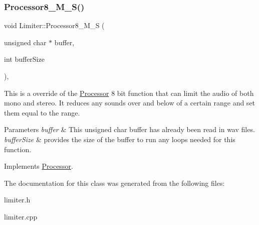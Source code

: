 \subsubsection{\texorpdfstring{Processor8\+\_\+\+M\+\_\+\+S()}{Processor8\_M\_S()}}
{\footnotesize\ttfamily void Limiter\+::\+Processor8\+\_\+\+M\+\_\+S (\begin{DoxyParamCaption}\item[{unsigned char $\ast$}]{buffer,  }\item[{int}]{buffer\+Size }\end{DoxyParamCaption})\hspace{0.3cm}{\ttfamily [override]}, {\ttfamily [virtual]}}



This is a override of the \hyperlink{classProcessor}{Processor} 8 bit function that can limit the audio of both mono and stereo. It reduces any sounds over and below of a certain range and set them equal to the range. 


\begin{DoxyParams}{Parameters}
{\em buffer} & This unsigned char buffer has already been read in wav files. \\
\hline
{\em buffer\+Size} & provides the size of the buffer to run any loops needed for this function. \\
\hline
\end{DoxyParams}


Implements \hyperlink{classProcessor}{Processor}.



The documentation for this class was generated from the following files\+:\begin{DoxyCompactItemize}
\item 
limiter.\+h\item 
limiter.\+cpp\end{DoxyCompactItemize}
